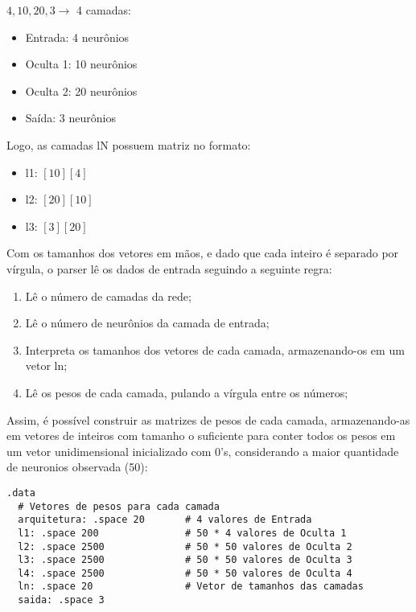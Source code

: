 \documentclass[12pt]{article}
\begin{document}
\begin{tcolorbox}[
  colframe=blue!30!white,  %
  colback=white,             %
  boxrule=0.8pt,            %
  arc=1mm,                  %
  left=6pt,                 %
  right=6pt,                %
  top=6pt,                  %
  bottom=6pt                %
]{
  
  $ 4, 10, 20, 3 \rightarrow $ 4 camadas:
  \begin{itemize}
      \item Entrada: 4 neurônios
      \item Oculta 1: 10 neurônios
      \item Oculta 2: 20 neurônios
      \item Saída: 3 neurônios
  \end{itemize}
  
  Logo, as camadas lN possuem matriz no formato:
  
  \begin{itemize}
      \item l1: $[10][4]$
      \item l2: $[20][10]$
      \item l3: $[3][20]$
  \end{itemize}
}\end{tcolorbox}  

Com os tamanhos dos vetores em mãos, e dado que cada inteiro é separado por vírgula, o parser lê os dados de entrada seguindo a seguinte regra:

\begin{enumerate}
  \item Lê o número de camadas da rede;
  \item Lê o número de neurônios da camada de entrada;
  \item Interpreta os tamanhos dos vetores de cada camada, armazenando-os em um vetor ln;
  \item Lê os pesos de cada camada, pulando a vírgula entre os números;
\end{enumerate}

\hspace{2em}Assim, é possível construir as matrizes de pesos de cada camada, armazenando-as em vetores de inteiros com tamanho o suficiente para conter todos os pesos em um vetor unidimensional inicializado com 0's, considerando a maior quantidade de neuronios observada (50):

\begin{lstlisting}[style=meucodigo]
.data
  # Vetores de pesos para cada camada
  arquitetura: .space 20       # 4 valores de Entrada
  l1: .space 200               # 50 * 4 valores de Oculta 1
  l2: .space 2500              # 50 * 50 valores de Oculta 2
  l3: .space 2500              # 50 * 50 valores de Oculta 3
  l4: .space 2500              # 50 * 50 valores de Oculta 4
  ln: .space 20                # Vetor de tamanhos das camadas
  saida: .space 3
\end{lstlisting}
\end{document}

